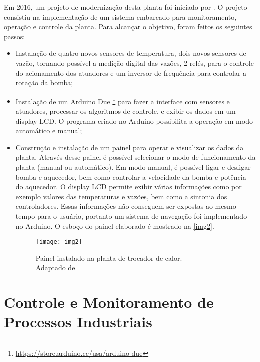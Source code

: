 		Em 2016, um projeto de modernização desta planta foi iniciado por \cite{luiz2016}.  O projeto consistiu na implementação de um sistema embarcado para monitoramento, operação e controle da planta. Para alcançar o objetivo, foram feitos os seguintes passos:
		\begin{itemize}
			\item 
			Instalação de quatro novos sensores de temperatura, dois novos sensores de vazão, tornando possível a medição digital das vazões, 2 relés, para o controle do acionamento dos atuadores e um inversor de frequência para controlar a rotação da bomba;
			\item 
			Instalação de um Arduino Due \footnote{\url{https://store.arduino.cc/usa/arduino-due}} para fazer a interface com sensores e atuadores, processar os algoritmos de controle, e exibir os dados em um display LCD. O programa criado no Arduino possibilita a operação em modo automático e manual;
			\item 
			Construção e instalação de um painel para operar e visualizar os dados da planta. Através desse painel é possível selecionar o modo de funcionamento da planta (manual ou automático). Em modo manual, é possível ligar e desligar bomba e aquecedor, bem como controlar a velocidade da bomba e potência do aquecedor. O display LCD permite exibir várias informações como por exemplo valores das temperaturas e vazões, bem como a sintonia dos controladores. Essas informações não conseguem ser expostas ao mesmo tempo para o usuário, portanto um sistema de navegação foi implementado no Arduino. O esboço do painel elaborado é mostrado na \autoref{img2}.
			
			\begin{figure}[!htb]	
				\captionsetup{justification=centering}
				\begin{center}
					\texttt{[image: img2]}  %
					\caption[Painel instalado na planta de trocador de calor]{\label{img2}Painel instalado na planta de trocador de calor. \\Adaptado de \cite{luiz2016}}
				\end{center}		
			\end{figure}
		
		\end{itemize}
	
	\section{Controle e Monitoramento de Processos Industriais}
		\label{sec:rev_monitor}
